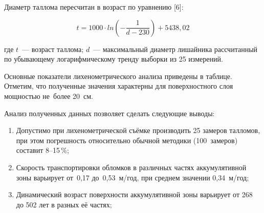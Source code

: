 Диаметр таллома пересчитан в возраст по уравнению [6]:

$$t = 1000\cdot ln{\left(-\frac{1}{d-230}\right)}+5438,02$$

где $t$~--- возраст таллома; $d$~--- максимальный диаметр лишайника рассчитанный по убывающему логарифмическому тренду выборки из 25 измерений.

Основные показатели лихенометрического анализа приведены в таблице. Отметим, что полученные значения характерны для поверхностного слоя мощностью не~более 20~см.





\clearpage

Анализ полученных данных позволяет сделать следующие выводы:

\begin{enumerate}[noitemsep]\vspace{-8pt}
  \item Допустимо при лихенометрической съёмке производить 25 замеров талломов, при этом погрешность относительно обычной методики (100~замеров) составит 8--15\,\%;
  \item Скорость транспортировки обломков в различных частях аккумулятивной зоны варьирует от~0,17 до~0,53~м/год, при среднем значении 0,34~м/год;
  \item Динамический возраст поверхности аккумулятивной зоны варьирует от 268 до 502 лет в разных её частях;
\end{enumerate}



